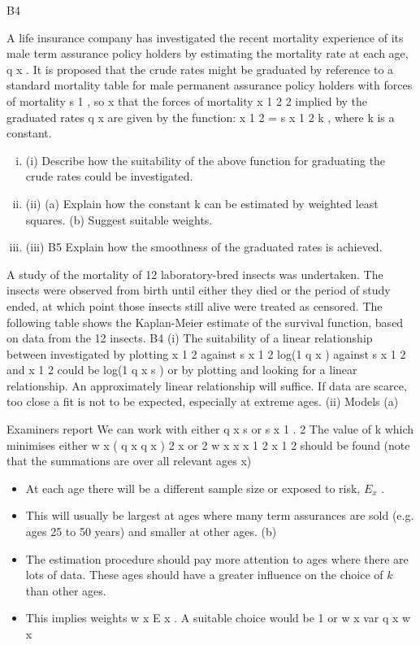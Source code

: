 \documentclass[a4paper,12pt]{article}
\begin{document}
\begin{enumerate}
B4

A life insurance company has investigated the recent mortality experience of its male
term assurance policy holders by estimating the mortality rate at each age, q x . It is
proposed that the crude rates might be graduated by reference to a standard mortality
table for male permanent assurance policy holders with forces of mortality s 1 , so
x
that the forces of mortality
x
1
2
2
implied by the graduated rates q x are given by the
function:
x
1
2
=
s
x
1
2
k ,
where k is a constant.
\begin{enumerate}[(i)]
\item (i)
Describe how the suitability of the above function for graduating the crude
rates could be investigated.

\item (ii)
(a) Explain how the constant k can be estimated by weighted least squares.
(b) Suggest suitable weights.

\item (iii)
B5
Explain how the smoothness of the graduated rates is achieved.
\end{enumerate}
\newpage
A study of the mortality of 12 laboratory-bred insects was undertaken. The insects
were observed from birth until either they died or the period of study ended, at which
point those insects still alive were treated as censored.
The following table shows the Kaplan-Meier estimate of the survival function, based
on data from the 12 insects.
B4
(i)
The suitability of a linear relationship between
investigated by plotting
x
1
2
against
s
x
1
2
log(1 q x ) against
s
x
1
2
and
x
1
2
could be
log(1 q x s ) or by plotting
and
looking for a linear relationship.
An approximately linear relationship will suffice.
If data are scarce, too close a fit is not to be expected, especially at extreme
ages.
(ii)
Models
(a)

Examiners report
We can work with either q x s or
s
x
1 .
2
The value of k which minimises either
w x ( q x q x ) 2
x
or
2
w x
x
x
1
2
x
1
2
should be found (note that the summations are over all relevant ages x)
\begin{itemize}
    \item At each age there will be a different sample size or exposed to risk, $E_x$ .
\item This will usually be largest at ages where many term assurances are
sold (e.g. ages 25 to 50 years) and smaller at other ages.
(b)
\item The estimation procedure should pay more attention to ages where
there are lots of data. These ages should have a greater influence on
the choice of $k$ than other ages.
\item This implies weights w x E x .
A suitable choice would be
1
or w x
var q x
w x
\end{itemize}


\end{enumerate}
\end{document}
